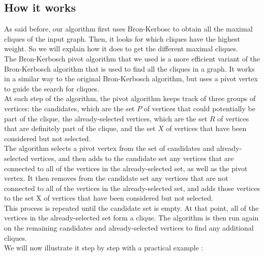 
\subsection{How it works}

    As said before, our algorithm first uses Bron-Kerbosc to obtain all the maximal cliques of the input graph. Then, it looks for which cliques have the highest weight. So we will explain how it does to get the different maximal cliques. \\

    The Bron-Kerbosch pivot algorithm that we used is a more efficient variant of the Bron-Kerbosch algorithm that is used to find all the cliques in a graph. It works in a similar way to the original Bron-Kerbosch algorithm, but uses a pivot vertex to guide the search for cliques. \\

    At each step of the algorithm, the pivot algorithm keeps track of three groups of vertices: the candidates, which are the set $P$ of vertices that could potentially be part of the clique, the already-selected vertices, which are the set $R$ of vertices that are definitely part of the clique, and the set $X$ of vertices that have been considered but not selected. \\

    The algorithm selects a pivot vertex from the set of candidates and already-selected vertices, and then adds to the candidate set any vertices that are connected to all of the vertices in the already-selected set, as well as the pivot vertex. It then removes from the candidate set any vertices that are not connected to all of the vertices in the already-selected set, and adds those vertices to the set X of vertices that have been considered but not selected. \\

    This process is repeated until the candidate set is empty. At that point, all of the vertices in the already-selected set form a clique. The algorithm is then run again on the remaining candidates and already-selected vertices to find any additional cliques. \\

    We will now illustrate it step by step with a practical example : \\

